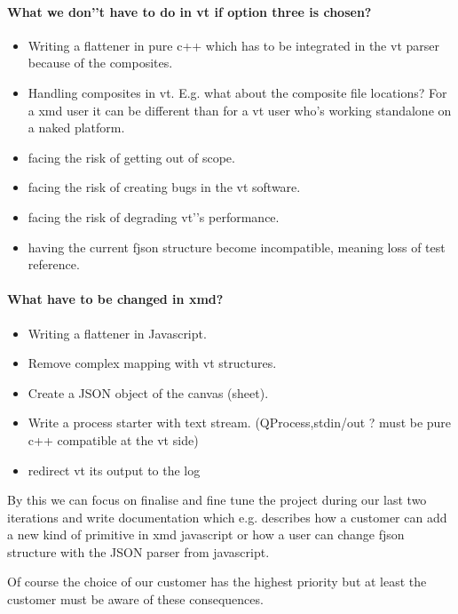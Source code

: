 \documentclass[a4paper,11pt,final]{article}
\begin{document}
\paragraph{What we don'’t have to do in vt if option three is chosen?}
\begin{itemize}
\item Writing a flattener in pure c++ which has to be integrated
	in the vt parser because of the composites.
\item Handling composites in vt. E.g. what about the composite 
	file locations? For a xmd user it can be different than for
	a vt user who's working standalone on a naked platform.
\item facing the risk of getting out of scope.
\item facing the risk of creating bugs in the vt software.
\item facing the risk of degrading vt'’s performance.
\item having the current fjson structure become incompatible,
	meaning loss of test reference.
\end{itemize}

\paragraph{What have to be changed in xmd?}
\begin{itemize}
\item Writing a flattener in Javascript.
\item Remove complex mapping with vt structures.
\item Create a JSON object of the canvas (sheet).
\item Write a process starter with text stream. (QProcess,stdin/out ? must be pure c++ compatible at the vt side)
\item redirect vt its output to the log
\end{itemize}


By this we can focus on finalise and fine tune the project during our last two iterations
and write documentation which e.g. describes how a customer can add a
new kind of primitive in xmd javascript or how a user can change fjson
structure with the JSON parser from javascript.

Of course the choice of our customer has the highest priority but
at least the customer must be aware of these consequences.
\end{document}

